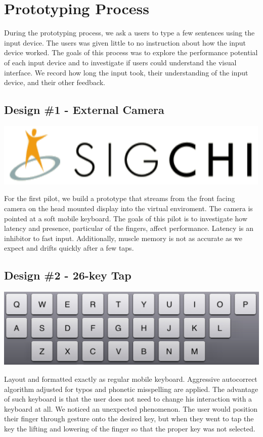 \section{Prototyping Process}
During the prototyping process, we ask a users to type a few sentences using the input device. 
The users was given little to no instruction about how the input device worked.
The goals of this process was to explore the performance potential of each input device and to investigate if users could understand the visual interface.
We record how long the input took, their understanding of the input device, and their other feedback.

\subsection{Design \#1 - External Camera}
\vspace*{.1cm}
\includegraphics[width=.9\columnwidth]{figures/sigchi-logo}

For the first pilot, we build a prototype that streams from the front facing camera on the head mounted display into the virtual enviroment.
The camera is pointed at a soft mobile keyboard.
The goals of this pilot is to investigate how latency and presence, particular of the fingers, affect performance.
Latency is an inhibitor to fast input.
Additionally, muscle memory is not as accurate as we expect and drifts quickly after a few taps.

\subsection{Design \#2 - 26-key Tap}
\vspace*{.1cm}
\includegraphics[width=.9\columnwidth]{figures/26Tap}

Layout and formatted exactly as regular mobile keyboard.
Aggressive autocorrect algorithm adjusted for typos and phonetic misspelling are applied.
The advantage of such keyboard is that the user does not need to change his interaction with a keyboard at all.
We noticed an unexpected phenomenon.
The user would  position their finger through gesture onto the desired key, but when they went to tap the key the lifting and lowering of the finger so that the proper key was not selected. 


